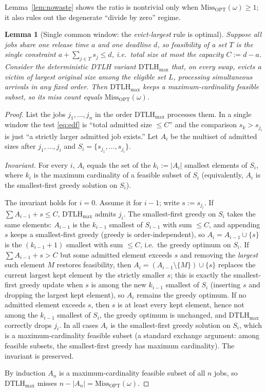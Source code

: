 \documentclass{amsart}
\newtheorem{lemma}[theorem]{Lemma}
\theoremstyle{definition}
\begin{document}
Lemma~\ref{lem:nowaste} shows the ratio is nontrivial only when
$\mathrm{Miss}_{\mathrm{OPT}}(\omega)\ge 1$; it also rules out the degenerate
``divide by zero'' regime.

\begin{lemma}[Single common window: the \emph{evict-largest} rule is optimal]
\label{lem:onewindow}
Suppose all jobs share one release time $a$ and one deadline $d$, so feasibility
of a set $T$ is the single constraint $a+\sum_{j\in T}s_j\le d$, i.e.\ total size
at most the capacity $C:=d-a$. Consider the deterministic DTLH variant
$\mathrm{DTLH}_{\max}$ that, on every swap, evicts a victim of \emph{largest}
original size among the eligible set $L$, processing simultaneous arrivals in any
fixed order. Then $\mathrm{DTLH}_{\max}$ keeps a maximum-cardinality feasible
subset, so its miss count equals $\mathrm{Miss}_{\mathrm{OPT}}(\omega)$.
\end{lemma}

\begin{proof}
List the jobs $j_1,\dots,j_n$ in the order $\mathrm{DTLH}_{\max}$ processes them.
In a single window the test \eqref{eq:edf} is ``total admitted size $\le C$'' and
the comparison $s_k>s_{j_i}$ is just ``a strictly larger admitted job exists.''
Let $A_i$ be the multiset of admitted sizes after $j_1,\dots,j_i$ and
$S_i=\{s_{j_1},\dots,s_{j_i}\}$.

\emph{Invariant.} For every $i$, $A_i$ equals the set of the $k_i:=|A_i|$
smallest elements of $S_i$, where $k_i$ is the maximum cardinality of a feasible
subset of $S_i$ (equivalently, $A_i$ is the smallest-first greedy solution on
$S_i$).

The invariant holds for $i=0$. Assume it for $i-1$; write $s:=s_{j_i}$. If
$\sum A_{i-1}+s\le C$, $\mathrm{DTLH}_{\max}$ admits $j_i$. The smallest-first
greedy on $S_i$ takes the same elements: $A_{i-1}$ is the $k_{i-1}$ smallest of
$S_{i-1}$ with sum $\le C$, and appending $s$ keeps a smallest-first greedy
(greedy is order-independent), so $A_i=A_{i-1}\cup\{s\}$ is the $(k_{i-1}{+}1)$
smallest with sum $\le C$, i.e.\ the greedy optimum on $S_i$. If
$\sum A_{i-1}+s>C$ but some admitted element exceeds $s$ and removing the
\emph{largest} such element $M$ restores feasibility, then
$A_i=(A_{i-1}\setminus\{M\})\cup\{s\}$ replaces the current largest kept element
by the strictly smaller $s$; this is exactly the smallest-first greedy update
when $s$ is among the new $k_{i-1}$ smallest of $S_i$ (inserting $s$ and dropping
the largest kept element), so $A_i$ remains the greedy optimum. If no admitted
element exceeds $s$, then $s$ is at least every kept element, hence not among the
$k_{i-1}$ smallest of $S_i$, the greedy optimum is unchanged, and
$\mathrm{DTLH}_{\max}$ correctly drops $j_i$. In all cases $A_i$ is the
smallest-first greedy solution on $S_i$, which is a maximum-cardinality feasible
subset (a standard exchange argument: among feasible subsets, the smallest-first
greedy has maximum cardinality). The invariant is preserved.

By induction $A_n$ is a maximum-cardinality feasible subset of all $n$ jobs, so
$\mathrm{DTLH}_{\max}$ misses $n-|A_n|=\mathrm{Miss}_{\mathrm{OPT}}(\omega)$.
\end{proof}
\end{document}
